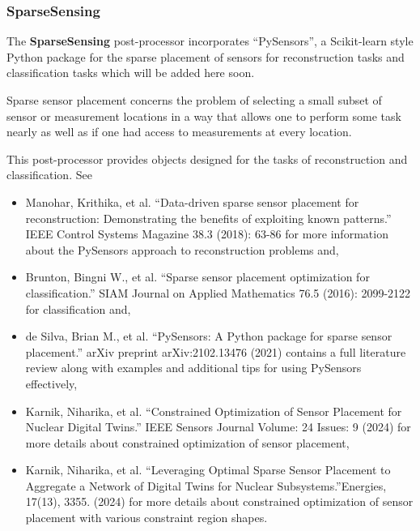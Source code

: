 \subsubsection{SparseSensing}
\label{SparseSensing}
The \textbf{SparseSensing} post-processor incorporates ``PySensors'', a Scikit-learn style Python package for the sparse placement of sensors for reconstruction tasks and classification tasks which will be added here soon.

Sparse sensor placement concerns the problem of selecting a small subset of sensor or measurement locations in a way that allows one to perform some task nearly as well as if one had access to measurements at every location.

This post-processor provides objects designed for the tasks of reconstruction and classification. See

\begin{itemize}
    \item Manohar, Krithika, et al. ``Data-driven sparse sensor placement for reconstruction: Demonstrating the benefits of exploiting known patterns.'' IEEE Control Systems Magazine 38.3 (2018): 63-86 for more information about the PySensors approach to reconstruction problems and,
    \item Brunton, Bingni W., et al. ``Sparse sensor placement optimization for classification.'' SIAM Journal on Applied Mathematics 76.5 (2016): 2099-2122 for classification and,
    \item de Silva, Brian M., et al. ``PySensors: A Python package for sparse sensor placement.'' arXiv preprint arXiv:2102.13476 (2021) contains a full literature review along with examples and additional tips for using PySensors effectively,
    \item Karnik, Niharika, et al. ``Constrained Optimization of Sensor Placement for Nuclear Digital Twins.'' IEEE Sensors Journal Volume: 24 Issues: 9 (2024) for more details about constrained optimization of sensor placement,
    \item Karnik, Niharika, et al. ``Leveraging Optimal Sparse Sensor Placement to Aggregate a Network of Digital Twins for Nuclear Subsystems.''Energies, 17(13), 3355. (2024) for more details about constrained optimization of sensor placement with various constraint region shapes.
\end{itemize}

